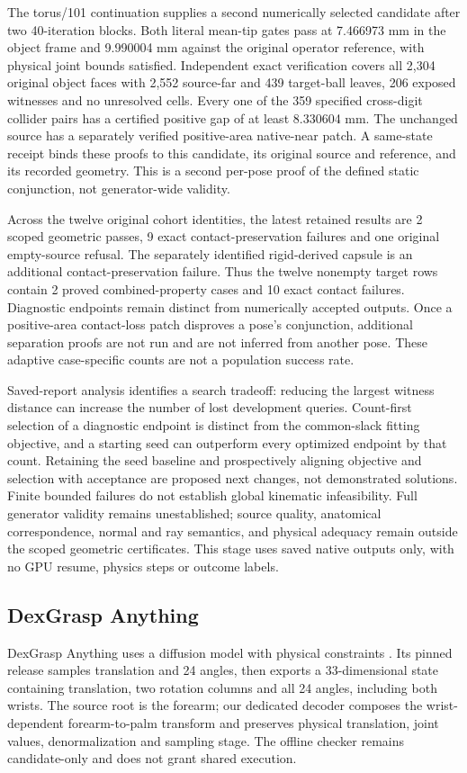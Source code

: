 \documentclass[10pt,letterpaper]{article}
\begin{document}
The torus/101 continuation supplies a second numerically selected candidate
after two 40-iteration blocks. Both literal mean-tip gates pass at
7.466973 mm in the object frame and 9.990004 mm against the original operator
reference, with physical joint bounds satisfied. Independent exact verification
covers all 2,304 original object faces with 2,552 source-far and 439 target-ball
leaves, 206 exposed witnesses and no unresolved cells. Every one of the 359
specified cross-digit collider pairs has a certified positive gap of at least
8.330604 mm. The unchanged source has a separately verified positive-area
native-near patch. A same-state receipt binds these proofs to this candidate,
its original source and reference, and its recorded geometry. This is a second
per-pose proof of the defined static conjunction, not generator-wide validity.

Across the twelve original cohort identities, the latest retained results are
2 scoped geometric passes, 9 exact contact-preservation failures and one
original empty-source refusal. The separately identified rigid-derived capsule
is an additional contact-preservation failure. Thus the twelve nonempty target
rows contain 2 proved combined-property cases and 10 exact contact failures.
Diagnostic endpoints remain distinct from numerically accepted outputs.
Once a positive-area contact-loss patch disproves a pose's conjunction,
additional separation proofs are not run and are not inferred from another
pose. These adaptive case-specific counts are not a population success rate.

Saved-report analysis identifies a search tradeoff: reducing the largest witness
distance can increase the number of lost development queries. Count-first
selection of a diagnostic endpoint is distinct from the common-slack fitting
objective, and a starting seed can outperform every optimized endpoint by
that count. Retaining the seed baseline and prospectively aligning objective
and selection with acceptance are proposed next changes, not demonstrated
solutions. Finite bounded failures do not establish global kinematic
infeasibility. Full generator validity remains unestablished; source quality,
anatomical correspondence, normal and ray semantics, and physical adequacy
remain outside the scoped geometric certificates. This stage uses saved
native outputs only, with no GPU resume, physics steps or outcome labels.

\subsection{DexGrasp Anything}
DexGrasp Anything uses a diffusion model with physical constraints
\cite{dga}. Its pinned release samples translation and 24 angles, then exports
a 33-dimensional state containing translation, two rotation columns and all
24 angles, including both wrists. The source root is the forearm; our dedicated
decoder composes the wrist-dependent forearm-to-palm transform and preserves
physical translation, joint values, denormalization and sampling stage.
The offline checker remains candidate-only and does not grant shared execution.
\end{document}
